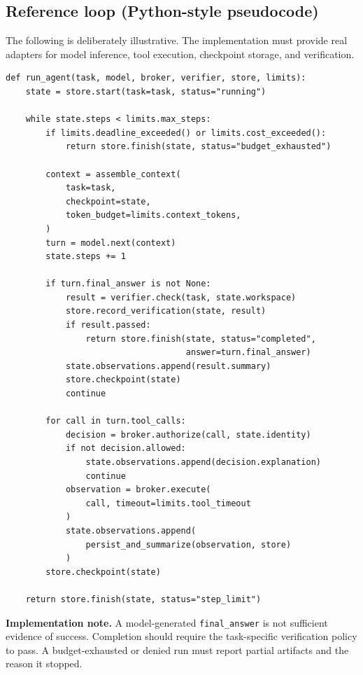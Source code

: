 \documentclass[10pt,letterpaper]{article}
\newcommand{\code}[1]{\texttt{#1}}
\begin{document}
\subsection{Reference loop (Python-style pseudocode)}
The following is deliberately illustrative. The implementation must provide real adapters for model inference, tool execution, checkpoint storage, and verification.
\begin{lstlisting}[style=pythonstyle,caption={Bounded agent orchestration pseudocode.}]
def run_agent(task, model, broker, verifier, store, limits):
    state = store.start(task=task, status="running")

    while state.steps < limits.max_steps:
        if limits.deadline_exceeded() or limits.cost_exceeded():
            return store.finish(state, status="budget_exhausted")

        context = assemble_context(
            task=task,
            checkpoint=state,
            token_budget=limits.context_tokens,
        )
        turn = model.next(context)
        state.steps += 1

        if turn.final_answer is not None:
            result = verifier.check(task, state.workspace)
            store.record_verification(state, result)
            if result.passed:
                return store.finish(state, status="completed",
                                    answer=turn.final_answer)
            state.observations.append(result.summary)
            store.checkpoint(state)
            continue

        for call in turn.tool_calls:
            decision = broker.authorize(call, state.identity)
            if not decision.allowed:
                state.observations.append(decision.explanation)
                continue
            observation = broker.execute(
                call, timeout=limits.tool_timeout
            )
            state.observations.append(
                persist_and_summarize(observation, store)
            )
        store.checkpoint(state)

    return store.finish(state, status="step_limit")
\end{lstlisting}

\begin{riskbox}
\textbf{Implementation note.} A model-generated \code{final\_answer} is not sufficient evidence of success. Completion should require the task-specific verification policy to pass. A budget-exhausted or denied run must report partial artifacts and the reason it stopped.
\end{riskbox}
\end{document}

